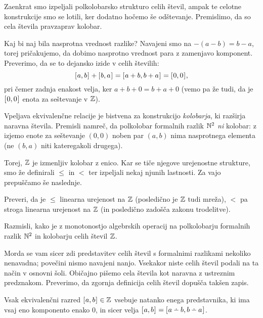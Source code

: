 Zaenkrat smo izpeljali polkolobarsko strukturo celih števil, ampak te celotne konstrukcije smo se lotili, ker dodatno hočemo še odštevanje. Premislimo, da so cela števila pravzaprav kolobar.

Kaj bi naj bila nasprotna vrednost razlike? Navajeni smo na $-(a - b) = b - a$, torej pričakujemo, da dobimo nasprotno vrednost para z zamenjavo komponent. Preverimo, da se to dejansko izide v celih številih:
\[\ec{a, b} + \ec{b, a} = \ec{a + b, b + a} = \ec{0, 0},\]
pri čemer zadnja enakost velja, ker $a + b + 0 = b + a + 0$ (vemo pa že tudi, da je $[\:\!{0, 0}\:\!]_{}$ enota za seštevanje v $\mathbb{Z}$).

\begin{naloga}
Vpeljava ekvivalenčne relacije je bistvena za konstrukcijo \emph{kolobarja}, ki razširja naravna števila. Premisli namreč, da polkolobar formalnih razlik $\mathbb{N}^2$ \emph{ni} kolobar: z izjemo enote za seštevanje $(0, 0)$ noben par $(a, b)$ nima nasprotnega elementa (ne $(b, a)$ niti kateregakoli drugega).
\end{naloga}

Torej, $\mathbb{Z}$ je izmenljiv kolobar z enico. Kar se tiče njegove urejenostne strukture, smo že definirali $\leq$ in $<$ ter izpeljali nekaj njunih lastnosti. Za vajo prepuščamo še naslednje.
%
\begin{naloga}
Preveri, da je $\leq$ linearna urejenost na $\mathbb{Z}$ (posledično je $\mathbb{Z}$ tudi mreža), $<$ pa stroga linearna urejenost na $\mathbb{Z}$ (in posledično zadošča zakonu trodelitve).
\end{naloga}

\begin{naloga}
Razmisli, kako je z monotonostjo algebrskih operacij na polkolobarju formalnih razlik $\mathbb{N}^2$ in kolobarju celih števil $\mathbb{Z}$.
\end{naloga}

Morda se vam sicer zdi predstavitev celih števil s formalnimi razlikami nekoliko nenavadna; povečini nismo navajeni nanjo. Vsekakor niste celih števil podali na ta način v osnovni šoli. Običajno pišemo cela števila kot naravna z ustreznim predznakom. Preverimo, da zgornja definicija celih števil dopušča takšen zapis.

\begin{trditev}\label{trditev:kanonicna-oblika-celega-stevila}
Vsak ekvivalenčni razred $[\:\!{a, b}\:\!]_{} \in \mathbb{Z}$ vsebuje natanko enega predstavnika, ki ima vsaj eno komponento enako $0$, in sicer velja $\ec{a, b} = \ec{a \monus b, b \monus a}$.
\end{trditev}

